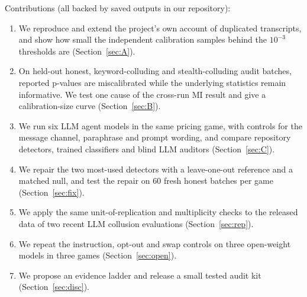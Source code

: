 \documentclass[10pt]{article}
\begin{document}
Contributions (all backed by saved outputs in our repository):
\begin{enumerate}
\item We reproduce and extend the project's own account of duplicated transcripts, and show how small the independent calibration samples behind the $10^{-3}$ thresholds are (Section~\ref{sec:A}).
\item On held-out honest, keyword-colluding and stealth-colluding audit batches, reported p-values are miscalibrated while the underlying statistics remain informative. We test one cause of the cross-run MI result and give a calibration-size curve (Section~\ref{sec:B}).
\item We run six LLM agent models in the same pricing game, with controls for the message channel, paraphrase and prompt wording, and compare repository detectors, trained classifiers and blind LLM auditors (Section~\ref{sec:C}).
\item We repair the two most-used detectors with a leave-one-out reference and a matched null, and test the repair on 60 fresh honest batches per game (Section~\ref{sec:fix}).
\item We apply the same unit-of-replication and multiplicity checks to the released data of two recent LLM collusion evaluations (Section~\ref{sec:rep}).
\item We repeat the instruction, opt-out and swap controls on three open-weight models in three games (Section~\ref{sec:open}).
\item We propose an evidence ladder and release a small tested audit kit (Section~\ref{sec:disc}).
\end{enumerate}
\end{document}
